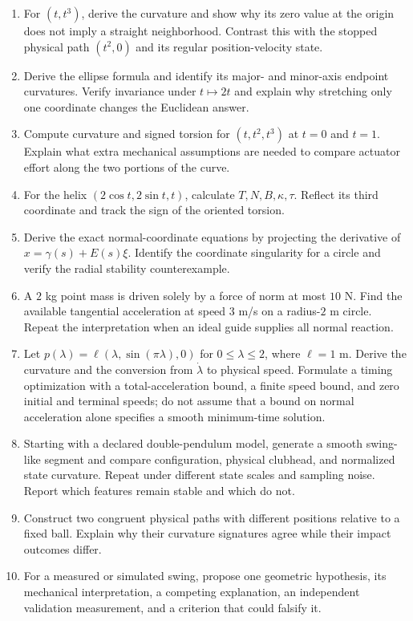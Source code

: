 \documentclass[12pt, openany]{book}
\theoremstyle{plain}
\begin{document}
\begin{enumerate}[itemsep=2pt,parsep=0pt]
\item For $(t,t^3)$, derive the curvature and show why its zero value at the
   origin does not imply a straight neighborhood. Contrast this with the
   stopped physical path $(t^2,0)$ and its regular position-velocity state.
\item Derive the ellipse formula and identify its major- and minor-axis
   endpoint curvatures. Verify invariance under $t\mapsto 2t$ and explain
   why stretching only one coordinate changes the Euclidean answer.
\item Compute curvature and signed torsion for $(t,t^2,t^3)$ at $t=0$ and
   $t=1$. Explain what extra mechanical assumptions are needed to compare
   actuator effort along the two portions of the curve.
\item For the helix $(2\cos t,2\sin t,t)$, calculate $T,N,B,\kappa,\tau$.
   Reflect its third coordinate and track the sign of the oriented torsion.
\item Derive the exact normal-coordinate equations by projecting the
   derivative of $x=\gamma(s)+E(s)\xi$. Identify the coordinate singularity
   for a circle and verify the radial stability counterexample.
\item A $2$ kg point mass is driven solely by a force of norm at most
   $10$ N. Find the available tangential acceleration at speed $3$ m/s on a
   radius-$2$ m circle. Repeat the interpretation when an ideal guide
   supplies all normal reaction.
\item Let $p(\lambda)=\ell(\lambda,\sin(\pi\lambda),0)$ for
   $0\le\lambda\le2$, where $\ell=1$ m. Derive the curvature and the
   conversion from $\dot\lambda$ to physical speed. Formulate a timing
   optimization with a total-acceleration bound, a finite speed bound, and
   zero initial and terminal speeds; do not assume that a bound on normal
   acceleration alone specifies a smooth minimum-time solution.
\item Starting with a declared double-pendulum model, generate a smooth
   swing-like segment and compare configuration, physical clubhead, and
   normalized state curvature. Repeat under different state scales and
   sampling noise. Report which features remain stable and which do not.
\item Construct two congruent physical paths with different positions
   relative to a fixed ball. Explain why their curvature signatures agree
   while their impact outcomes differ.
\item For a measured or simulated swing, propose one geometric hypothesis,
   its mechanical interpretation, a competing explanation, an independent
   validation measurement, and a criterion that could falsify it.
\end{enumerate}
\end{document}
